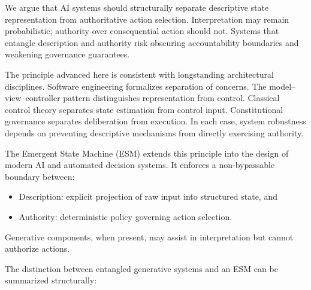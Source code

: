 \documentclass[11pt]{article}
\begin{document}
We argue that AI systems should structurally separate descriptive state representation from authoritative action selection. Interpretation may remain probabilistic; authority over consequential action should not. Systems that entangle description and authority risk obscuring accountability boundaries and weakening governance guarantees.

The principle advanced here is consistent with longstanding architectural disciplines. Software engineering formalizes separation of concerns. The model–view–controller pattern distinguishes representation from control. Classical control theory separates state estimation from control input. Constitutional governance separates deliberation from execution. In each case, system robustness depends on preventing descriptive mechanisms from directly exercising authority.

The Emergent State Machine (ESM) extends this principle into the design of modern AI and automated decision systems. It enforces a non-bypassable boundary between:

\begin{itemize}
  \item Description: explicit projection of raw input into structured state, and
  \item Authority: deterministic policy governing action selection.
\end{itemize}

Generative components, when present, may assist in interpretation but cannot authorize actions.

The distinction between entangled generative systems and an ESM can be summarized structurally:
\end{document}
